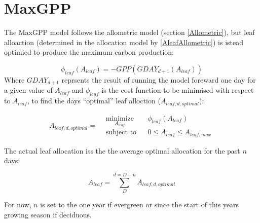 \section{MaxGPP}
The MaxGPP model follows the allometric model (section \ref{Allometric}), but leaf alloaction (determined in the allocation model by \ref{AleafAllometric}) is istead optimied to produce the maximum carbon production:

\begin{equation}
	\phi_{leaf}(A_{leaf}) = - GPP (GDAY_{d+1}(A_{leaf}))
\end{equation}
Where $GDAY_{d+1}$ reprsents the result of running the model foreward one day for a given value of $A_{leaf}$ and $\phi_{leaf}$ is the cost function to be minimised with respect to $A_{leaf}$, to find the days  ``optimal'' leaf alloction ($A_{leaf,d,optimal}$):

\begin{equation*}
A_{leaf,d,optimal}=
\begin{aligned}
& \underset{A_{leaf}}{\text{minimize}}
& & \phi_{leaf}(A_{leaf}) \\
& \text{subject to}
& & 0 \leq A_{leaf} \leq A_{leaf,max}
\end{aligned}
\end{equation*}

The actual leaf allocation iss the the average optimal allocation for the past $n$ days:

\begin{equation}
	A_{leaf}= \sum_{D}^{d=D-n} A_{leaf,d,optimal}
\end{equation}

For now, $n$ is set to the one year if evergreen or since the start of this years growing season if deciduous.